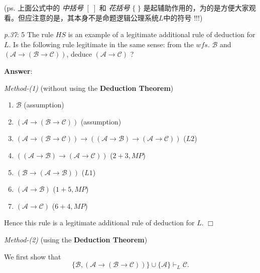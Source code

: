 \documentclass[UTF8,12pt,a4paper]{ctexart}
\begin{document}
\vspace{1em}

(ps. 上面公式中的 \textit{中括号} $[ \;]$ 和 \textit{花括号} $\{ \; \}$ 是起辅助作用的，为的是方便大家观看。但应注意的是，其本身不是命题逻辑公理系统$L$中的符号 !!!)

\vspace{2em}

\emph{p.37}: 5 \quad
The rule $HS$ is an example of a legitimate additional rule of deduction for $L$. Is the following rule legitimate in the same sense: from the $wfs.$ $\mathscr{B}$ and $(\mathscr{A} \to (\mathscr{B} \to \mathscr{C}))$, deduce $(\mathscr{A} \to \mathscr{C})$ ?

\noindent\textbf{Answer}:   

\noindent\textit{Method-(1)} (without using the \textbf{Deduction Theorem})

\begin{enumerate}
	\item $\mathscr{B}$
	\hfill (assumption)
	
	\item $(\mathscr{A} \to (\mathscr{B} \to \mathscr{C}))$
	\hfill (assumption)
	
	
	\item $(\mathscr{A} \to (\mathscr{B} \to \mathscr{C})) \to ((\mathscr{A} \to \mathscr{B}) \to (\mathscr{A} \to \mathscr{C})) $
	\hfill ($L2$)
	
	
	\item $( (\mathscr{A} \to \mathscr{B}) \to (\mathscr{A} \to \mathscr{C}) )$
	\hfill ($2 + 3, MP$)
	
	\item $(\mathscr{B} \to (\mathscr{A} \to \mathscr{B}))$
	\hfill ($L1$)
	
	\item $(\mathscr{A} \to \mathscr{B})$
	\hfill ($1+5, MP$)
	
	\item $(\mathscr{A} \to \mathscr{C})$
	\hfill ($6+4, MP$)
\end{enumerate}

Hence this rule is a legitimate additional rule of deduction for $L$.
\hfill $\Box$



\vspace{1em}
\noindent\textit{Method-(2)} (using the \textbf{Deduction Theorem})

We first show that 
\[
\{\mathscr{B}, (\mathscr{A} \to (\mathscr{B} \to \mathscr{C}))\} \cup \{ \mathscr{A}\} \vdash_L \mathscr{C}.
\]
\end{document}
